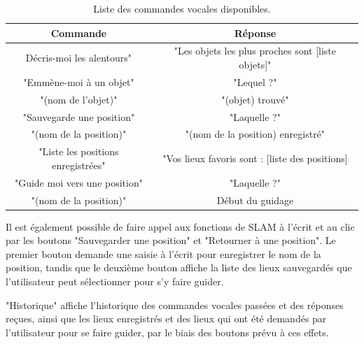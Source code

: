 \documentclass[11pt]{article}
\begin{document}
        \begin{table}[!hbt]
          \begin{tabular}{|c|c|}
            \hline
            \textbf{Commande} & \textbf{Réponse} \\
            \hline \hline
            Décris-moi les alentours" & "Les objets les plus proches sont [liste objets]" \\
            \hline
            "Emmène-moi à un objet" & "Lequel ?" \\ 
            "(nom de l'objet)" & "(objet) trouvé" \\
            \hline
            "Sauvegarde une position" & "Laquelle ?" \\ 
            "(nom de la position)" & "(nom de la position) enregistré" \\
            \hline
            "Liste les positions enregistrées" & "Vos lieux favoris sont : [liste des positions] \\
            \hline
            "Guide moi vers une position" & "Laquelle ?" \\ 
            "(nom de la position)" & Début du guidage \\    
            \hline  
            
          \end{tabular}
          \caption{\label{tab:ListeCommandes} Liste des commandes vocales disponibles.}
      \end{table}
        
        Il est également possible de faire appel aux fonctions de SLAM à l'écrit et au clic par les boutons "Sauvegarder une position" et "Retourner à une position". 
        Le premier bouton demande une saisie à l'écrit pour enregistrer le nom de la position, tandis que le deuxième bouton affiche la liste des lieux sauvegardés que 
        l'utilisateur peut sélectionner pour s'y faire guider.   
      
        "Historique" affiche l'historique des commandes vocales passées et des réponses reçues, ainsi que les lieux enregistrés et des lieux qui ont été demandés 
        par l'utilisateur pour se faire guider, par le biais des boutons prévu à ces effets.   
          
\end{document}

